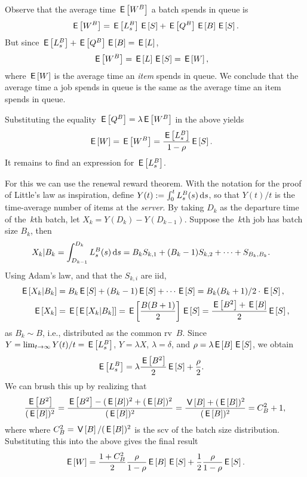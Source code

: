 \documentclass[stochastic-or.tex]{subfiles}
\begin{document}
Observe that the average time $\E{\W^{B}}$ a batch spends in queue is
\begin{equation*}
  \E{\W^B} =  \E{\Ls^B}\E S + \E{\QQ^B} \E B \E S.
\end{equation*}
But since $\E{\Ls^B} + \E{\QQ^B} \E B = \E \L$,
\begin{align*}
  \E{\W^B} &=  \E\L \E S = \E{\W},
\end{align*}
where $\E W$ is the average time an \emph{item} spends in queue.
We conclude that the average time a job spends in queue is the same as the average time an item spends in queue.

Substituting the equality  $\E{\QQ^B} = \lambda \E{\W^B}$  in the above yields
\begin{align}\label{eq:96}
\E W =  \E{\W^B} &= \frac{\E{\Ls^B}}{1-\rho}\E{S}.
\end{align}
It remains to find an expression for $\E{\Ls^B}$.

For this we can use the renewal reward theorem.
With the notation for the proof of Little's law as inspiration, define $Y(t) := \int_0^t \Ls^B(s) \d s$, so that $Y(t)/t$  is the time-average number of items at the \emph{server}.
By taking $D_k$ as the departure time of the~$k$th batch, let $X_k = Y(D_k)-Y(D_{k-1})$.
Suppose the~$k$th job has batch size $B_{k}$, then
  \begin{align*}
    X_k|B_{k} &= \int_{D_{k-1}}^{D_k} \Ls^B(s) \d s
    = B_{k} S_{k,1} + (B_{k}-1)S_{k,2} + \cdots + S_{B_{k}, B_{k}}.
  \end{align*}
Using Adam's law, and that the $S_{k,i}$ are iid,
\begin{align*}
    \E{X_k | B_k} &= B_{k}\E S + (B_{k}-1)\E S + \cdots \E S = B_{k}(B_{k}+1)/2 \cdot \E S, \\
    \E{X_k} & = \E{\E{X_k| B_k}} = \E{\frac{B(B+1)}2} \E S =    \frac{\E{B^2}+\E B}2 \E S,
\end{align*}
as $B_{k}\sim B$, i.e., distributed as the common rv~$B$.
Since $Y=\lim_{t\to\infty} Y(t)/t = \E{\Ls^{B}}$, $Y=\lambda X$, $\lambda = \delta$, and $\rho=\lambda \E B \E S$, we obtain
\begin{align}\label{eq:17}
  \E{\Ls^B} &= \lambda \frac{\E{B^2}}2\E S + \frac\rho 2. %
\end{align}
We can brush this up by realizing that
\begin{align*}
\frac{\E{B^2}}{(\E{B})^2}
  =\frac{\E{B^2}-(\E B)^2 + (\E B)^2}{(\E{B})^2}
= \frac{\V B + (\E B)^2}{(\E B)^2}= C_B^2+1,
\end{align*}
where where $C_B^2 = \V B/ (\E B)^{2}$ is the scv of the batch size distribution.
Substituting this into the above gives the final result
\begin{equation}\label{eq:43}
\E{\W} =
\frac{1+C_B^2}2 \frac{\rho}{1-\rho} \E B \E S + \frac12\frac\rho{1-\rho} \E S.
\end{equation}
\end{document}
